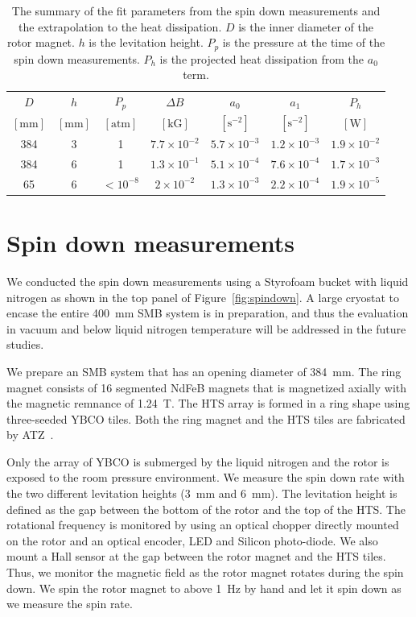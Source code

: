 \documentclass[journal]{IEEEtran}
\begin{document}
\begin{table}[tb]
   \centering
   \begin{tabular}{c|c|c|c|c|c|c} %
	    $D$ & $h$& $P_p$ & $\Delta B$ &$a_0$ & $a_1$  & $P_h$\\
	     $[\mbox{mm}]$ & $[\mbox{mm}]$ & $[\mbox{atm}]$ & $[\mbox{kG}]$ & $[\mbox{s}^{-2}]$  & $[\mbox{s}^{-2}]$  & $[\mbox{W}]$ \\ \hline
        384 & 3  & 1  & $7.7\times10^{-2}$ & $5.7\times10^{-3}$  & $1.2\times10^{-3}$ & $1.9\times10^{-2}$\\
	384 & 6  &  1 & $1.3\times10^{-1}$ & $5.1\times10^{-4}$ & $7.6\times10^{-4}$ & $1.7\times10^{-3}$\\
	65 & 6   &  $<10^{-8}$ & $2\times10^{-2}$ & $1.3\times10^{-3}$ & $2.2\times10^{-4}$ & $1.9\times10^{-5}$
   \end{tabular}
   \caption{The summary of the fit parameters from the spin down measurements and the extrapolation to the heat dissipation.
     $D$ is the inner diameter of the rotor magnet.
     $h$ is the levitation height.
     $P_p$ is the pressure at the time of the spin down measurements.
     $P_h$ is the projected heat dissipation from the $a_0$ term.}
   \label{tab:fitpar}
\end{table}

\section{Spin down measurements}
We conducted the spin down measurements using a Styrofoam bucket with liquid nitrogen as shown in the top panel of Figure~\ref{fig:spindown}.
A large cryostat to encase the entire 400~mm SMB system is in preparation, and thus the evaluation in vacuum and below liquid nitrogen temperature will be addressed in the future studies. 

We prepare an SMB system that has an opening diameter of 384~mm.
The ring magnet consists of 16 segmented NdFeB magnets that is magnetized axially with the magnetic remnance of 1.24~T.
The HTS array is formed in a ring shape using three-seeded YBCO tiles.
Both the ring magnet and the HTS tiles are fabricated by ATZ~\cite{atz}.

Only the array of YBCO is submerged by the liquid nitrogen and the rotor is exposed to the room pressure environment. 
We measure the spin down rate with the two different levitation heights (3~mm and 6~mm).
The levitation height is defined as the gap between the bottom of the rotor and the top of the HTS.
The rotational frequency is monitored by using an optical chopper directly mounted on the rotor and an optical encoder, LED and Silicon photo-diode.
We also mount a Hall sensor at the gap between the rotor magnet and the HTS tiles.
Thus, we monitor the magnetic field as the rotor magnet rotates during the spin down.
We spin the rotor magnet to above 1~Hz by hand and let it spin down as we measure the spin rate. 
\end{document}
